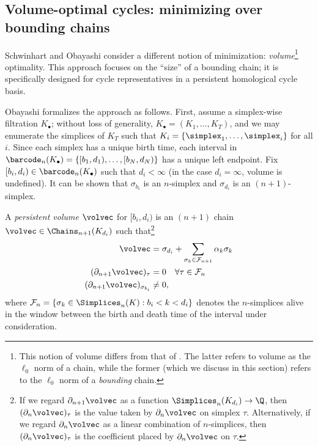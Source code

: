 \subsection{Volume-optimal cycles: minimizing over bounding chains}\label{sec:volume}

Schwinhart \cite{schweinhart2015statistical} and  Obayashi \cite{Obayashi2018} consider a different notion of minimization: \emph{volume}\footnote{This notion of volume differs from that of \cite{chenhardness}. The latter refers to volume as the $\ell_0$ norm of a chain, while the former (which we discuss in this section) refers to the $\ell_0$ norm of a \emph{bounding} chain.} optimality.  This approach focuses on the ``size'' of a bounding chain; it is specifically designed for cycle representatives in a persistent homological cycle basis.    


Obayashi \cite{Obayashi2018} formalizes the approach as follows.  First, assume a simplex-wise filtration $K_\bullet$; without loss of generality, $K_\bullet = (K_1, \ldots, K_T)$, and we may enumerate the simplices of $K_T$ such that $K_i = \{\simplex_1, \ldots, \simplex_i\}$ for all $i$.  Since each simplex has a unique birth time, each interval in  $\barcode_n(K_\bullet)= \{[b_1, d_1), \ldots, [b_N, d_N)\}$ has a unique left  endpoint.  Fix $[b_i,d_i) \in \barcode_n(K_\bullet)$ such that $d_i < \infty$ (in the case $d_i = \infty$, volume is undefined).    It can be shown that $\sigma_{b_i}$ is an $n$-simplex and  $\sigma_{d_i}$ is an $(n+1)$-simplex.

A \emph{persistent volume} $\volvec$ for $[b_i, d_i)$ is an $(n+1)$ chain $\volvec \in \Chains_{n+1}(K_{d_i})$ such that\footnote{If we regard $\partial_{n+1}\volvec$ as a function $\Simplices_{n}(K_{d_i}) \to \Q$, then $(\partial_n \volvec)_\tau$ is the value taken by $\partial_n \volvec$ on simplex $\tau$.  Alternatively, if we regard $\partial_n \volvec$ as a linear combination of $n$-simplices, then $(\partial_n \volvec)_\tau$ is the coefficient placed by $\partial_n \volvec$ on $\tau$.}
\begin{align}
    \volvec   & = \sigma_{d_i} + \sum_{\sigma_k \in \mathcal{F}_{n+1}} \alpha_k\sigma_k \label{obacond1} \\
    (\partial_{n+1} \volvec)_\tau  & = 0 \quad \forall \tau \in \mathcal{F}_n \label{obacond2}\\
    (\partial_{n+1} \volvec)_{\sigma_{b_i}}  & \ne 0, \label{obacond3}
\end{align}
where $\mathcal{F}_n = \{\sigma_k \in \Simplices_n(K) : b_i < k < d_i \}$ denotes the $n$-simplices alive in the window between the birth and death time of the interval under consideration.   

